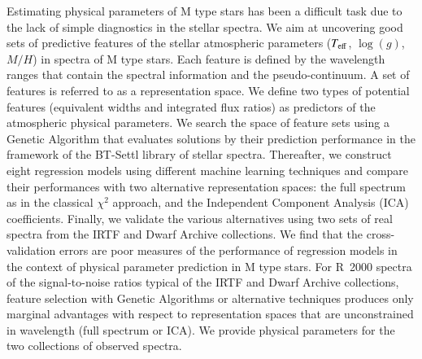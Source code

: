 \documentclass[printer]{aa}
\begin{document}
   \abstract
    {Estimating physical parameters of M type stars has been a
      difficult task due to the lack of simple diagnostics in the
      stellar spectra.}
    {We aim at uncovering good sets of predictive features of the
      stellar atmospheric parameters ($T_{\rm eff}$, $\log(g)$, $M/H$)
      in spectra of M type stars. Each feature is defined by the
      wavelength ranges that contain the spectral information and the
      pseudo-continuum. A set of features is referred to as a
      representation space.}
    {We define two types of potential features (equivalent widths and
      integrated flux ratios) as predictors of the atmospheric
      physical parameters. We search the space of feature sets using a
      Genetic Algorithm that evaluates solutions by their prediction
      performance in the framework of the BT-Settl library of stellar
      spectra. Thereafter, we construct eight regression models using
      different machine learning techniques and compare their
      performances with two alternative representation spaces: the
      full spectrum as in the classical $\chi^2$ approach, and the
      Independent Component Analysis (ICA) coefficients. Finally, we
      validate the various alternatives using two sets of real spectra
      from the IRTF and Dwarf Archive collections.}
    {We find that the cross-validation errors are poor measures of the
      performance of regression models in the context of physical
      parameter prediction in M type stars. For R~2000 spectra of the
      signal-to-noise ratios typical of the IRTF and Dwarf Archive
      collections, feature selection with Genetic Algorithms or
      alternative techniques produces only marginal advantages with
      respect to representation spaces that are unconstrained in
      wavelength (full spectrum or ICA). We provide physical
      parameters for the two collections of observed spectra.}
    {}


   \maketitle
%
\end{document}
